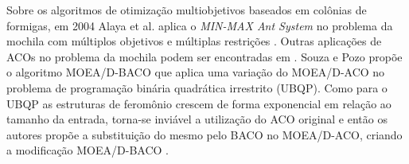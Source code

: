 Sobre os algoritmos de otimização multiobjetivos baseados em colônias de formigas, em 2004 Alaya et al. aplica o \textit{MIN-MAX Ant System} no problema da mochila com múltiplos objetivos e múltiplas restrições \cite{Alaya2004}. Outras aplicações de ACOs no problema da mochila podem ser encontradas em \cite{changdar2013,Ke2010,Fingler2014,kong2008,Fidanova2003}. Souza e Pozo propõe o algoritmo MOEA/D-BACO que aplica uma variação do MOEA/D-ACO no problema de programação binária quadrática irrestrito (UBQP). Como para o UBQP as estruturas de feromônio crescem de forma exponencial em relação ao tamanho da entrada, torna-se inviável a utilização do ACO original e então os autores propõe a substituição do mesmo pelo BACO no MOEA/D-ACO, criando a modificação MOEA/D-BACO \cite{SouzaPozo2015}.